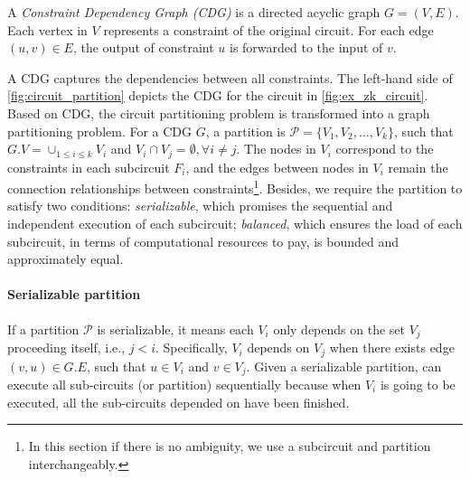 
\begin{definition}\label{def:cdg}
A \textit{Constraint Dependency Graph (CDG)} is a directed acyclic graph  $G = (V, E)$. Each vertex in $V$ represents a constraint of the original circuit.  For each edge $(u, v) \in E$, the output of constraint $u$ is forwarded to the input of $v$. 
\end{definition}


A CDG captures the dependencies between all constraints. The left-hand side of \cref{fig:circuit_partition} depicts the CDG for the circuit in \ref{fig:ex_zk_circuit}. Based on CDG, the circuit partitioning problem is transformed into a graph partitioning problem. For a CDG $G$, a partition  is $\mathcal{P}=\{V_1, V_2, \ldots, V_k\}$, such that $G.V=\cup_{1\le i \le k}V_i$ and $V_i \cap V_j = \emptyset, \forall i\ne j$. The nodes in $V_i$ correspond to the constraints in each subcircuit $F_i$, and the edges between nodes in $V_i$ remain the connection relationships between constraints\footnote{In this section if there is no ambiguity, we use a subcircuit and partition interchangeably. }.
Besides, we require the partition to satisfy two conditions: \emph{serializable}, which promises the sequential and independent execution of each subcircuit; \emph{balanced}, which ensures the load of each subcircuit,  in terms of computational resources to pay,  is bounded and approximately equal. 


\paragraph{Serializable partition} If a partition $\mathcal{P}$ is serializable, it means each $V_i$ only depends on the set $V_j$ proceeding itself, i.e., $j<i$. Specifically, $V_i$ depends on $V_j$ when there exists edge $(v, u) \in G.E$, such that $u \in V_i$ and $v \in V_j$. Given a serializable partition, \system can execute all sub-circuits (or partition) sequentially because when $V_i$ is going to be executed, all the sub-circuits depended on have been finished. 


